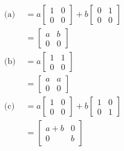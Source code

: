 \documentclass[main.tex]{subfiles}
\begin{document}
\begin{enumerate}
    $$
    \begin{aligned}
    \text{(a) }&=a\left[\begin{array}{ll}
    1 & 0 \\
    0 & 0
    \end{array}\right]+b\left[\begin{array}{ll}
    0 & 1 \\
    0 & 0
    \end{array}\right] \\
    &=\left[\begin{array}{ll}
    a & b \\
    0 & 0
    \end{array}\right]\\
    \text{(b) }&=a\left[\begin{array}{ll}
    1 & 1 \\
    0 & 0
    \end{array}\right] \\
    &=\left[\begin{array}{ll}
    a & a \\
    0 & 0
    \end{array}\right]\\
    \text{(c) }&=a\left[\begin{array}{ll}
    1 & 0 \\
    0 & 0
    \end{array}\right]+b\left[\begin{array}{ll}
    1 & 0 \\
    0 & 1
    \end{array}\right] \\
    &=\left[\begin{array}{cc}
    a+b & 0 \\
    0 & b
    \end{array}\right]
    \end{aligned}
    $$
    

\end{enumerate}
\end{document}
